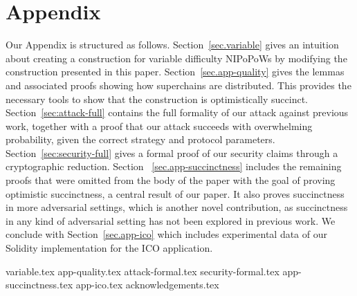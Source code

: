 \appendix
\section*{Appendix}

Our Appendix is structured as follows.
Section~\ref{sec.variable} gives an intuition about creating a construction for
variable difficulty NIPoPoWs by modifying the construction presented in this
paper.
Section~\ref{sec.app-quality} gives the lemmas and associated proofs showing how
superchains are distributed. This provides the necessary tools to show that the
construction is optimistically succinct. Section~\ref{sec:attack-full} contains
the full formality of our attack against previous work, together with a proof
that our attack succeeds with overwhelming probability, given the correct
strategy and protocol parameters. Section~\ref{sec:security-full} gives a formal
proof of our security claims through a cryptographic reduction. Section~
\ref{sec.app-succinctness} includes the remaining proofs that were omitted from
the body of the paper with the goal of proving optimistic succinctness, a
central result of our paper. It also proves succinctness in more adversarial
settings, which is another novel contribution, as succinctness in any kind of
adversarial setting has not been explored in previous work. We conclude with
Section~\ref{sec.app-ico} which includes experimental data of our Solidity
implementation for the ICO application.

{variable.tex}
{app-quality.tex}
{attack-formal.tex}
{security-formal.tex}
{app-succinctness.tex}
{app-ico.tex}
{acknowledgements.tex}
